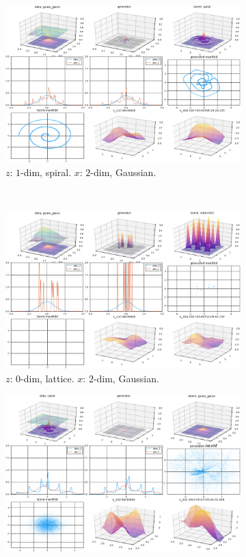 \begin{figure}[ht]
\centering
    \begin{subfigure}[t]{0.45\textwidth}
        \includegraphics[width=\linewidth]{"fig/spiral_gaussgauss_00030000"}
        \caption{$z$: $1$-dim, spiral.
            $x$: $2$-dim, Gaussian.}
    \end{subfigure}
    ~
    \begin{subfigure}[t]{0.45\textwidth}
        \includegraphics[width=\linewidth]{"fig/lattice3x3_gaussgauss_00030000"}
        \caption{$z$: $0$-dim, lattice.
            $x$: $2$-dim, Gaussian.}
    \end{subfigure}
    \vskip 0.4cm
    \begin{subfigure}[t]{0.45\textwidth}
        \includegraphics[width=\linewidth]{"fig/gaussgauss_spiral_00030000"}

\end{subfigure}
\end{figure}
